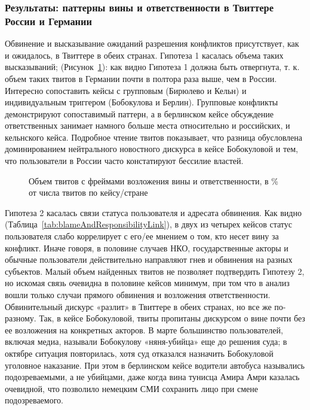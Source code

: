 \subsubsection{Результаты: паттерны вины и ответственности в Твиттере России и Германии}

Обвинение и высказывание ожиданий разрешения конфликтов присутствует, как и ожидалось, в Твиттере в обеих странах. Гипотеза 1 касалась объема таких высказываний; (Рисунок~\cref{fig:blameAndResponsibilityTweets}): как видно Гипотеза 1 должна быть отвергнута, т. к. объем таких твитов в Германии почти в полтора раза выше, чем в России. Интересно сопоставить кейсы с групповым (Бирюлево и Кельн) и индивидуальным триггером (Бобокулова и Берлин). Групповые конфликты демонстрируют сопоставимый паттерн, а в берлинском кейсе обсуждение ответственных занимает намного больше места относительно и российских, и кельнского кейса. Подробное чтение твитов показывает, что разница обусловлена доминированием нейтрального новостного дискурса в кейсе Бобокуловой и тем, что пользователи в России часто констатируют бессилие властей.

\begin{figure}[ht]
	\caption{Объем твитов с фреймами возложения вины и ответственности, в \% от числа твитов по кейсу/стране}\label{fig:blameAndResponsibilityTweets}
\end{figure}

Гипотеза 2 касалась связи статуса пользователя и адресата обвинения. Как видно (Таблица~\cref{tab:blameAndResponsibilityLink}), в двух из четырех кейсов статус пользователя слабо коррелирует с его/ее мнением о том, кто несет вину за конфликт. Иначе говоря, в половине случаев НКО, государственные акторы и обычные пользователи действительно направляют гнев и обвинения на разных субъектов. Малый объем найденных твитов не позволяет подтвердить Гипотезу 2, но искомая связь очевидна в половине кейсов минимум, при том что в анализ вошли только случаи прямого обвинения и возложения ответственности. Обвинительный дискурс «разлит» в Твиттере в обеих странах, но все же по-разному. Так, в кейсе Бобокуловой, твиты пропитаны дискурсом о вине почти без ее возложения на конкретных акторов. В марте большинство пользователей, включая медиа, называли Бобокулову «няня-убийца» еще до решения суда; в октябре ситуация повторилась, хотя суд отказался назначить Бобокуловой уголовное наказание. При этом в берлинском кейсе водители автобуса назывались подозреваемыми, а не убийцами, даже когда вина тунисца Амира Амри казалась очевидной, что позволило немецким СМИ сохранить лицо при смене подозреваемого.


